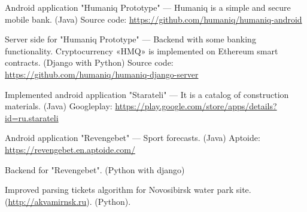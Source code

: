\begin{cventries}
\cventry
{} %
{} %
{} %
{} %
{
\begin{cvitems}
    \item {
        \begin{flushleft}
            Android application "Humaniq Prototype" --- Humaniq is a simple and secure mobile bank. (Java)\linebreak
            Source code: \url{https://github.com/humaniq/humaniq-android}\linebreak
        \end{flushleft}
    }
    \item {
        \begin{flushleft}
            Server side for "Humaniq Prototype" ---
            Backend with some banking functionality. Cryptocurrency «HMQ» is implemented on Ethereum smart contracts. (Django with Python)\linebreak
            Source code: \url{https://github.com/humaniq/humaniq-django-server}\linebreak
        \end{flushleft}
    }
    \item {
        \begin{flushleft}
            Implemented android application "Starateli" --- It is a catalog of construction materials. (Java)\linebreak
            Googleplay: \url{https://play.google.com/store/apps/details?id=ru.starateli}\linebreak
        \end{flushleft}
    }
    \item {
        \begin{flushleft}
            Android application "Revengebet" --- Sport forecasts. (Java)\linebreak
            Aptoide: \url{https://revengebet.en.aptoide.com/}\linebreak
        \end{flushleft}
    }
    \item {
        \begin{flushleft}
            Backend for "Revengebet". (Python with django)\linebreak
        \end{flushleft}
    }
    \item {
        \begin{flushleft}
            Improved parsing tickets algorithm for Novosibirsk water park site. (\url{http://akvamirnsk.ru}). (Python).\linebreak

\end{flushleft}}
\end{cvitems}}
\end{cventries}
